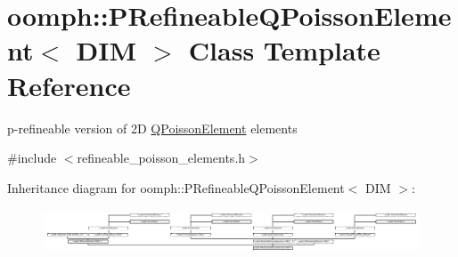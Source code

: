 \hypertarget{classoomph_1_1PRefineableQPoissonElement}{}\section{oomph\+:\+:P\+Refineable\+Q\+Poisson\+Element$<$ D\+IM $>$ Class Template Reference}
\label{classoomph_1_1PRefineableQPoissonElement}


p-\/refineable version of 2D \hyperlink{classoomph_1_1QPoissonElement}{Q\+Poisson\+Element} elements  




{\ttfamily \#include $<$refineable\+\_\+poisson\+\_\+elements.\+h$>$}

Inheritance diagram for oomph\+:\+:P\+Refineable\+Q\+Poisson\+Element$<$ D\+IM $>$\+:\begin{figure}[H]
\begin{center}
\leavevmode
\includegraphics[height=1.352657cm]{classoomph_1_1PRefineableQPoissonElement}
\end{center}
\end{figure}
